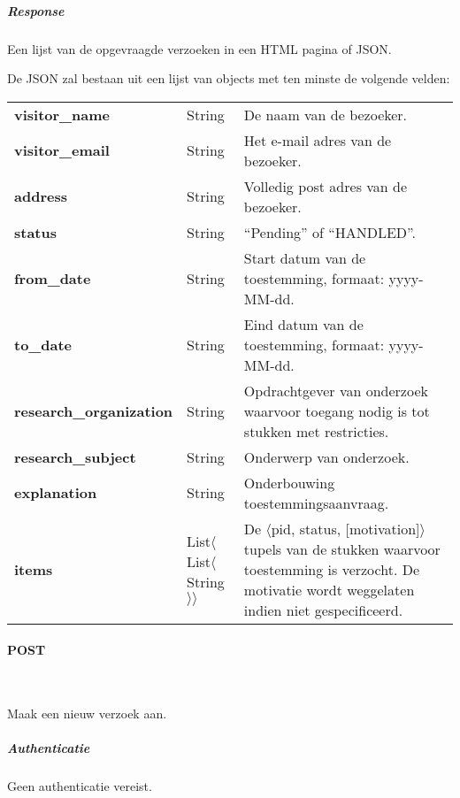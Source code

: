\documentclass[a4paper,titlepage]{report}
\makeatletter
\def\namedlabel#1#2{
  \label{#1}
  \begingroup
   \def\@currentlabel{#2}%
   \label{#1:name}\endgroup
}
\makeatother
\begin{document}
          \subparagraph{Response}
            Een lijst van de opgevraagde verzoeken in een HTML pagina of JSON.

            De JSON zal bestaan uit een lijst van objects met ten minste de
            volgende velden:\\

            \begin{tabular}{ l l p{8cm} }
              \textbf{visitor\_name} & String & De naam van de bezoeker. \\
              \textbf{visitor\_email} & String & Het e-mail adres van de
              bezoeker. \\
              \textbf{address} & String & Volledig post adres van de bezoeker.
              \\
              \textbf{status} & String & ``Pending'' of ``HANDLED''. \\
              \textbf{from\_date} & String & Start datum van de toestemming,
              formaat: yyyy-MM-dd. \\
              \textbf{to\_date} & String & Eind datum van de toestemming,
              formaat: yyyy-MM-dd. \\
              \textbf{research\_organization} & String & Opdrachtgever van
              onderzoek waarvoor toegang nodig is tot stukken met restricties.
              \\
              \textbf{research\_subject} & String & Onderwerp van onderzoek. \\
              \textbf{explanation} & String & Onderbouwing toestemmingsaanvraag.
              \\
              \textbf{items} & List$\langle$List$\langle$String$\rangle\rangle$
              & De $\langle$pid, status, [motivation]$\rangle$ tupels van de stukken waarvoor
              toestemming is verzocht. De motivatie wordt weggelaten indien niet
              gespecificeerd.\\
            \end{tabular}

        \paragraph{POST}\hfill\\
          \namedlabel{api:permission-list:post}{POST /permission/}
          Maak een nieuw verzoek aan.

          \subparagraph{Authenticatie}
            Geen authenticatie vereist.
\end{document}

